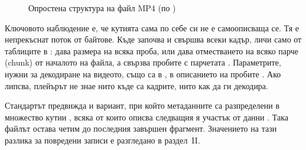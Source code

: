 \begin{figure}[H]
\centering
{}
\caption{Опростена структура на файл MP4 (по \cite{iso14496_12, iso14496_15})}
\label{fig:mp4}
\end{figure}

Ключовото наблюдение е, че кутията  сама по себе си не е самоописваща се.
Тя е непрекъснат поток от байтове. Къде започва и свършва всеки кадър, личи само от
таблиците в :  дава размера на всяка проба,  или
 дава отместването на всяко парче (chunk) от началото на файла, а
 свързва пробите с парчетата \cite{iso14496_12}. Параметрите, нужни за
декодиране на видеото, също са в , в описанието на пробите .
Ако  липсва, плейърът не знае нито къде са кадрите, нито как да ги декодира.

Стандартът предвижда и  вариант, при който метаданните са
разпределени в множество кутии , всяка от които описва следващия я участък
от данни \cite{iso14496_12}. Така файлът остава четим до последния завършен фрагмент.
Значението на тази разлика за повредени записи е разгледано в раздел~II.

